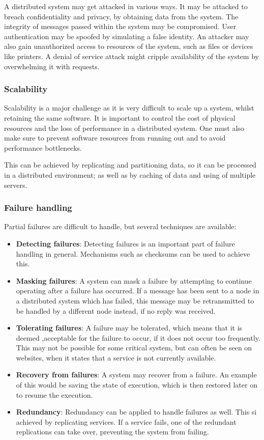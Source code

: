 \documentclass[a4paper]{article}
\begin{document}
A distributed system may get attacked in various ways. It may be attacked to breach confidentiality and privacy, by obtaining data from the system. The integrity of messages passed within the system may be compromised. User authentication may be spoofed by simulating a false identity. An attacker may also gain unauthorized access to resources of the system, such as files or devices like printers. A denial of service attack might cripple availability of the system by overwhelming it with requests.

\subsubsection{Scalability}

Scalability is a major challenge as it is very difficult to scale up a system, whilst retaining the same software. It is important to control the cost of physical resources and the loss of performance in a distributed system. One must also make sure to prevent software resources from running out and to avoid performance bottlenecks.

This can be achieved by replicating and partitioning data, so it can be processed in a distributed environment; as well as by caching of data and using of multiple servers.

\subsubsection{Failure handling}

Partial failures are difficult to handle, but several techniques are available:
\begin{itemize}
\item \textbf{Detecting failures}: Detecting failures is an important part of failure handling in general. Mechanisms such as checksums can be used to achieve this.
\item \textbf{Masking failures}: A system can mask a failure by attempting to continue operating after a failure has occurred. If a message has been sent to a node in a distributed system which has failed, this message may be retransmitted to be handled by a different node instead, if no reply was received.
\item \textbf{Tolerating failures}: A failure may be tolerated, which means that it is deemed ,acceptable for the failure to occur, if it does not occur too frequently. This may not be possible for some critical system, but can often be seen on websites, when it states that a service is not currently available.
\item \textbf{Recovery from failures}: A system may recover from a failure. An example of this would be saving the state of execution, which is then restored later on to resume the execution.
\item \textbf{Redundancy}: Redundancy can be applied to handle failures as well. This si achieved by replicating services. If a service fails, one of the redundant replications can take over, preventing the system from failing.
\end{itemize}
\end{document}
